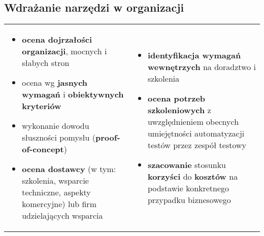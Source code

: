 \documentclass[../main.tex]{subfiles}
\begin{document}
    \subsection{Wdrażanie narzędzi w organizacji}
    \begin{table}[H]
        \begin{center}
            \begin{tabular}{p{8cm} p{8cm}}
                \begin{itemize}
                    \item \textbf{ocena dojrzałości organizacji}, mocnych i słabych stron
                    \item ocena wg \textbf{jasnych wymagań} i \textbf{obiektywnych kryteriów}
                    \item wykonanie dowodu słuszności pomysłu (\textbf{proof-of-concept})
                    \item \textbf{ocena dostawcy} (w tym: szkolenia, wsparcie techniczne, aspekty komercyjne) lub firm udzielających wsparcia
                \end{itemize}
                &
                \begin{itemize}
                    \item \textbf{identyfikacja wymagań wewnętrzych} na doradztwo i szkolenia
                    \item \textbf{ocena potrzeb szkoleniowych} z uwzględnieniem obecnych umiejętności automatyzacji testów przez zespół testowy
                    \item \textbf{szacowanie} stosunku \textbf{korzyści} do \textbf{kosztów} na podstawie konkretnego przypadku biznesowego
                \end{itemize}
            \end{tabular}
        \end{center}
    \end{table}
\end{document}
